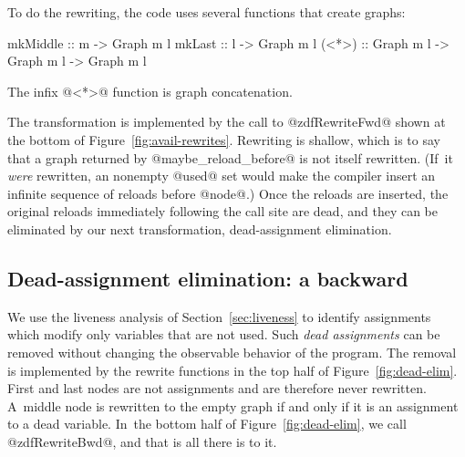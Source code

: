 \documentclass[blockstyle,preprint,nocopyrightspace]{sigplanconf}
\newcommand{\authornote}[1]{{\em #1}}
\def\authornote#1{\unskip\relax}
\newcommand{\simon}[1]{\authornote{SLPJ: #1}}
\newcommand{\norman}[1]{\authornote{NR: #1}}
\let\remark\norman
\newcommand{\john}[1]{\authornote{JD: #1}}
\newcommand\secref[1]{Section~\ref{sec:#1}}
\newcommand\seclabel[1]{\label{sec:#1}}
\newcommand\figref[1]{Figure~\ref{fig:#1}}
\begin{document}
To do the rewriting, the code uses several functions that create
graphs:
\begin{code}
mkMiddle :: m -> Graph m l
mkLast   :: l -> Graph m l
(<*>)    :: Graph m l -> Graph m l -> Graph m l
\end{code}
The infix @<*>@ function is graph concatenation.

The transformation is implemented by the call to @zdfRewriteFwd@
shown at the bottom of \figref{avail-rewrites}.
Rewriting is shallow, which is to say that a graph returned by
@maybe_reload_before@ is not itself rewritten.
(If~it \emph{were} rewritten, an nonempty @used@ set would make the
compiler insert an infinite sequence of reloads before @node@.)
Once the reloads are inserted, the original reloads immediately
following the call site are dead, and they can be eliminated by our
next transformation, dead-assignment elimination.

\subsection{Dead-assignment elimination: a backward }
\simon{Backward reference needed to ``Pass 3 of the algorithm described
in the preamble to Section 4''}

\seclabel{dead-code-elimination}
\seclabel{dead-code-elim}

\seclabel{bwd-rewrite}


\def\liveout{$\mathit{live_{out}}$}

We use the liveness analysis of \secref{liveness} to identify
assignments which modify only variables that are not used.
Such \emph{dead assignments} can be removed without changing the
observable behavior of the program.
The removal is implemented by the rewrite functions in the top half of
\figref{dead-elim}. 
First and last nodes are not assignments and are therefore never
rewritten.
A~middle node is rewritten to the empty graph if and only if it is an
assignment to a dead variable.
In~the bottom half of \figref{dead-elim}, we call @zdfRewriteBwd@, and
that is all there is to it.
\john{Need to run this version of the code in anger.}
%
\remark{In this space we should have some guff about
composing transformations, which should refer to the example on
eliminating the induction variable.}
\end{document}

